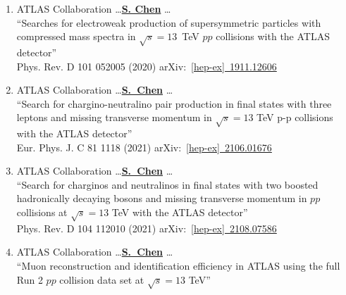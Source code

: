 \documentclass[12pt]{article}
\begin{document}
\begin{enumerate}
%
%
	\item ATLAS Collaboration \dots \underline{\textbf{S. Chen}} \dots \\
		   ``Searches for electroweak production of supersymmetric particles with compressed mass spectra in $\sqrt{s}=13$~TeV $pp$ collisions with the ATLAS detector'' \\
	            Phys. Rev. D 101 052005 (2020) arXiv:~\href{https://arxiv.org/abs/1911.12606}{[hep-ex]~1911.12606}  \label{Pub::ATLPaper_EWCompressed}
%
	\item ATLAS Collaboration \dots \underline{\textbf{S.~Chen}} \dots \\
          ``Search for chargino-neutralino pair production in final states with three leptons and missing transverse momentum in $\sqrt{s}=13$ TeV p-p collisions with the ATLAS detector'' \\
	    Eur. Phys. J. C 81 1118 (2021)  arXiv:~\href{https://arxiv.org/abs/2106.01676}{[hep-ex]~2106.01676}  \label{Pub::ATLPaper_EW3L}
%
	\item ATLAS Collaboration \dots \underline{\textbf{S.~Chen}} \dots \\
          ``Search for charginos and neutralinos in final states with two boosted hadronically decaying bosons and missing transverse momentum in $pp$ collisions at $\sqrt{s}=13$ TeV with the ATLAS detector'' \\
	    Phys. Rev. D 104 112010 (2021)  arXiv:~\href{https://arxiv.org/abs/2108.07586}{[hep-ex]~2108.07586}   \label{Pub::ATLPaper_EW0L}          
%
	\item ATLAS Collaboration \dots \underline{\textbf{S.~Chen}} \dots \\
              ``Muon reconstruction and identification efficiency in ATLAS using the full Run 2 $pp$ collision data set at $\sqrt{s}=13$ TeV'' \\

\end{enumerate}
\end{document}
